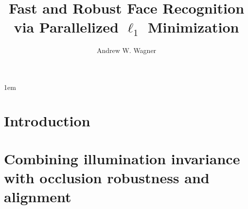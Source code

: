 \documentclass[draftthesis,tocnosub,noragright,centerchapter,12pt]{uiucecethesis09}
\title{Fast and Robust Face Recognition \\
		via Parallelized $\ell_1$ Minimization}
\author{Andrew W. Wagner}
\begin{document}

\maketitle

\parindent 1em%

\frontmatter

\begin{abstract}
 
\end{abstract}


%

\tableofcontents





\mainmatter

\chapter{Introduction}
\label{chap:introduction}


\chapter{Combining illumination invariance with occlusion robustness and alignment}
\label{chap:cvpr}
%
\end{document}
